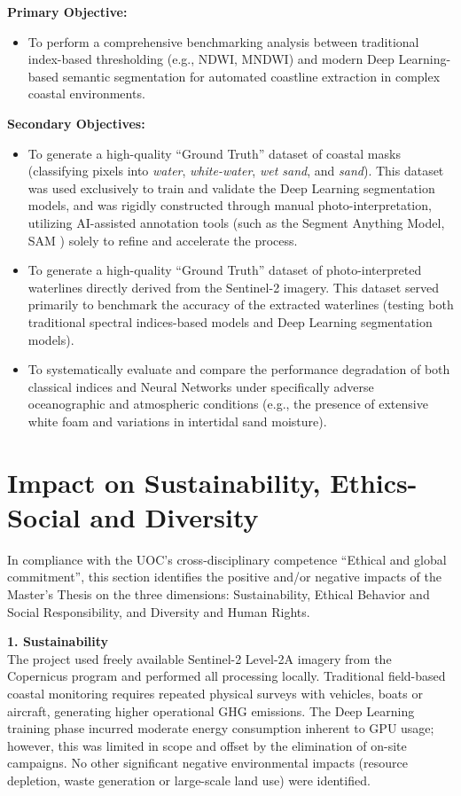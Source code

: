 ﻿\documentclass[ENG]{TFUOC}%
\begin{document}
\vspace{0.3cm}
\noindent\textbf{Primary Objective:}
\begin{itemize}
    \item To perform a comprehensive benchmarking analysis between traditional index-based thresholding (e.g., NDWI, MNDWI) and modern Deep Learning-based semantic segmentation for automated coastline extraction in complex coastal environments.
\end{itemize}

\noindent\textbf{Secondary Objectives:}
\begin{itemize}
    \item To generate a high-quality ``Ground Truth'' dataset of coastal masks (classifying pixels into \textit{water}, \textit{white-water}, \textit{wet sand}, and \textit{sand}). This dataset was used exclusively to train and validate the Deep Learning segmentation models, and was rigidly constructed through manual photo-interpretation, utilizing AI-assisted annotation tools (such as the Segment Anything Model, SAM \citep{kirillov_segment_2023}) solely to refine and accelerate the process.
    \item To generate a high-quality ``Ground Truth'' dataset of photo-interpreted waterlines directly derived from the Sentinel-2 imagery. This dataset served primarily to benchmark the accuracy of the extracted waterlines (testing both traditional spectral indices-based models and Deep Learning segmentation models).
    \item To systematically evaluate and compare the performance degradation of both classical indices and Neural Networks under specifically adverse oceanographic and atmospheric conditions (e.g., the presence of extensive white foam and variations in intertidal sand moisture).
\end{itemize}

\section{Impact on Sustainability, Ethics-Social and Diversity}
\label{s:etic}

In compliance with the UOC's cross-disciplinary competence ``Ethical and global commitment'', this section identifies the positive and/or negative impacts of the Master's Thesis on the three dimensions: Sustainability, Ethical Behavior and Social Responsibility, and Diversity and Human Rights.

\textbf{1. Sustainability} \\
The project used freely available Sentinel-2 Level-2A imagery from the Copernicus program and performed all processing locally. Traditional field-based coastal monitoring requires repeated physical surveys with vehicles, boats or aircraft, generating higher operational GHG emissions. The Deep Learning training phase incurred moderate energy consumption inherent to GPU usage; however, this was limited in scope and offset by the elimination of on-site campaigns. No other significant negative environmental impacts (resource depletion, waste generation or large-scale land use) were identified.
\end{document}
